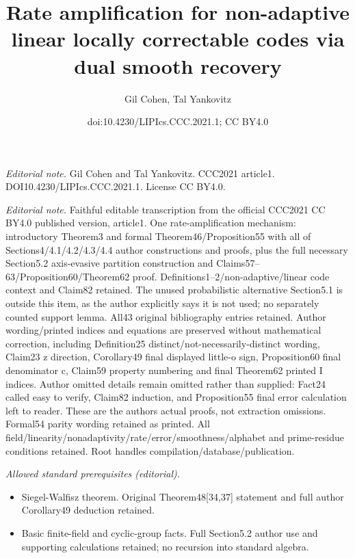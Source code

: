 \documentclass[10pt,a4paper]{article}
\title{Rate amplification for non-adaptive linear locally correctable codes via dual smooth recovery}
\author{Gil Cohen, Tal Yankovitz}
\date{doi:10.4230/LIPIcs.CCC.2021.1; CC BY4.0}
\begin{document}
\maketitle
\noindent\textit{Editorial note.} Gil Cohen and Tal Yankovitz. CCC2021 article1. DOI10.4230/LIPIcs.CCC.2021.1. License CC BY4.0.\par\medskip
\noindent\textit{Editorial note.} Faithful editable transcription from the official CCC2021 CC BY4.0 published version, article1. One rate-amplification mechanism: introductory Theorem3 and formal Theorem46/Proposition55 with all of Sections4/4.1/4.2/4.3/4.4 author constructions and proofs, plus the full necessary Section5.2 axis-evasive partition construction and Claims57--63/Proposition60/Theorem62 proof. Definitions1--2/non-adaptive/linear code context and Claim82 retained. The unused probabilistic alternative Section5.1 is outside this item, as the author explicitly says it is not used; no separately counted support lemma. All43 original bibliography entries retained. Author wording/printed indices and equations are preserved without mathematical correction, including Definition25 distinct/not-necessarily-distinct wording, Claim23 z direction, Corollary49 final displayed little-o sign, Proposition60 final denominator c, Claim59 property numbering and final Theorem62 printed I indices. Author omitted details remain omitted rather than supplied: Fact24 called easy to verify, Claim82 induction, and Proposition55 final error calculation left to reader. These are the authors actual proofs, not extraction omissions. Formal54 parity wording retained as printed. All field/linearity/nonadaptivity/rate/error/smoothness/alphabet and prime-residue conditions retained. Root handles compilation/database/publication.\par\medskip
\noindent\textit{Allowed standard prerequisites (editorial).}\begin{itemize}
\item Siegel-Walfisz theorem. Original Theorem48[34,37] statement and full author Corollary49 deduction retained.
\item Basic finite-field and cyclic-group facts. Full Section5.2 author use and supporting calculations retained; no recursion into standard algebra.
\end{itemize}\medskip
\setcounter{nttheorem}{45}
\end{document}
